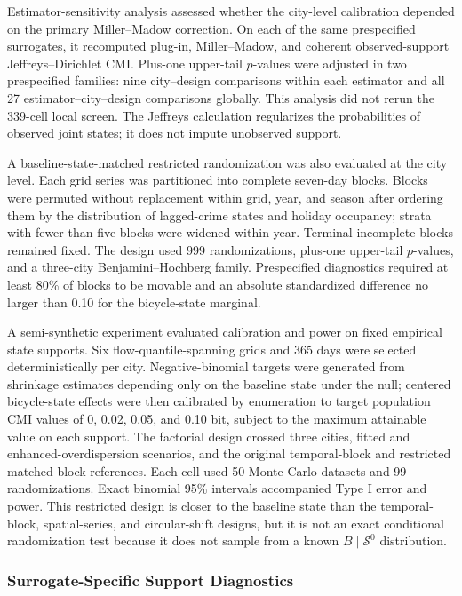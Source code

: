 Estimator-sensitivity analysis assessed whether the city-level calibration
depended on the primary Miller--Madow correction. On each of the same
prespecified surrogates, it
recomputed plug-in, Miller--Madow, and coherent observed-support
Jeffreys--Dirichlet CMI. Plus-one upper-tail \(p\)-values were adjusted in
two prespecified families: nine city--design comparisons within each
estimator and all 27 estimator--city--design comparisons globally. This
analysis did not rerun the 339-cell local screen. The Jeffreys calculation regularizes
the probabilities of observed joint states; it does not impute
unobserved support.

A baseline-state-matched restricted randomization was also evaluated at the
city level. Each grid series was partitioned into complete seven-day blocks.
Blocks were permuted without replacement within grid, year, and season
after ordering them by the distribution of lagged-crime states and holiday
occupancy; strata with fewer than five blocks were widened within year.
Terminal incomplete blocks remained fixed. The design used 999
randomizations, plus-one upper-tail \(p\)-values, and a three-city
Benjamini--Hochberg family. Prespecified diagnostics required at least 80\%
of blocks to be movable and an absolute standardized difference no larger
than 0.10 for the bicycle-state marginal.

A semi-synthetic experiment evaluated calibration and power on fixed
empirical state supports. Six flow-quantile-spanning grids and 365 days
were selected deterministically per city. Negative-binomial targets were
generated from shrinkage estimates depending only on the baseline state
under the null; centered bicycle-state effects were then calibrated by
enumeration to target population CMI values of 0, 0.02, 0.05, and 0.10
bit, subject to the maximum attainable value on each support. The factorial
design crossed three cities, fitted and enhanced-overdispersion scenarios,
and the original temporal-block and restricted matched-block references.
Each cell used 50 Monte Carlo datasets and 99 randomizations. Exact
binomial 95\% intervals accompanied Type I error and power. This restricted
design is closer to the baseline state than the temporal-block, spatial-series,
and circular-shift designs, but it is not an exact
conditional randomization test because it does not sample from a known
\(B\mid\mathcal S^0\) distribution.

\subsubsection{Surrogate-Specific Support Diagnostics}
\label{subsec:e13_support_methods}

